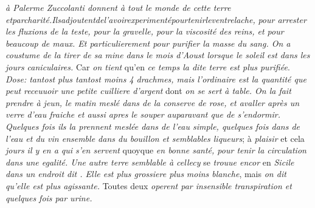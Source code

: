 \textit{\`{a} Palerme\protect{} Zuccolanti
donnent \`{a} tout le monde de cette terre \hfill et\hfill par\hfill charit\'{e}.\hfill Ils\hfill adjoutent\hfill de\hfill l'avoir\hfill experiment\'{e}\hfill pour\hfill tenir\hfill le\hfill ventre\hfill lache,} 
\pend
\newpage
\pstart \noindent \textit{pour arrester les fluxions de la teste, pour la gravelle, pour la viscosit\'{e} des reins\protect{}, et pour beaucoup de maux. Et particulierement pour purifier la masse du sang\protect{}. On a coustume de la tirer de sa mine dans le mois d'Aoust lorsque le soleil est dans les jours caniculaires.}
Car \textit{on tient} qu'en \textit{ce temps la dite terre est plus purifi\'{e}e}.
%
%
\textit{Dose: tantost plus tantost moins 4 drachmes, mais l'ordinaire est la quantit\'{e} que peut receuuoir une petite cuilliere d'argent} dont \textit{on se sert \`{a} table. On la fait prendre \`{a} jeun, le matin mesl\'{e} dans de la conserve de rose, et avaller apr\`{e}s un verre d'eau fraiche et aussi apres le souper auparavant que de s'endormir. Quelques fois ils la prennent mesl\'{e}e dans de l'eau simple, quelques fois dans de l'eau et du vin ensemble dans du bouillon et semblables liqueurs}; \`{a} \textit{plaisir}%
%
et cela  \textit{jours il y en a qui s'en servent} quoyque  \textit{en bonne sant\'{e}, pour tenir la circulation dans une egalit\'{e}. Une autre terre semblable \`{a} cellecy} se \textit{trouue encor} en \textit{Sicile\protect{} dans un endroit dit \protect{}.
Elle est plus grossiere plus}  \textit{moins blanche}, mais \textit{on dit qu'elle est plus agissante.}
%
Toutes deux \textit{operent par insensible transpiration et quelques fois par urine.}
